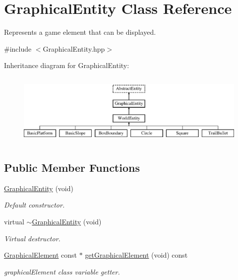 \hypertarget{class_graphical_entity}{}\section{Graphical\+Entity Class Reference}
\label{class_graphical_entity}


Represents a game element that can be displayed.  




{\ttfamily \#include $<$Graphical\+Entity.\+hpp$>$}

Inheritance diagram for Graphical\+Entity\+:\begin{figure}[H]
\begin{center}
\leavevmode
\includegraphics[height=3.522013cm]{class_graphical_entity}
\end{center}
\end{figure}
\subsection*{Public Member Functions}
\begin{DoxyCompactItemize}
\item 
\hyperlink{class_graphical_entity_af5d385d6973e4547e11a26123a747c9d}{Graphical\+Entity} (void)
\begin{DoxyCompactList}\small\item\em Default constructor. \end{DoxyCompactList}\item 
virtual \hyperlink{class_graphical_entity_a1004dcb764464cd2112b9e2ae155189d}{$\sim$\+Graphical\+Entity} (void)
\begin{DoxyCompactList}\small\item\em Virtual destructor. \end{DoxyCompactList}\item 
\hyperlink{class_graphical_element}{Graphical\+Element} const $\ast$ \hyperlink{class_graphical_entity_ac83fdd85a8d7ef87d65534bf0644da24}{get\+Graphical\+Element} (void) const 
\begin{DoxyCompactList}\small\item\em graphical\+Element class variable getter. \end{DoxyCompactList}\end{DoxyCompactItemize}
